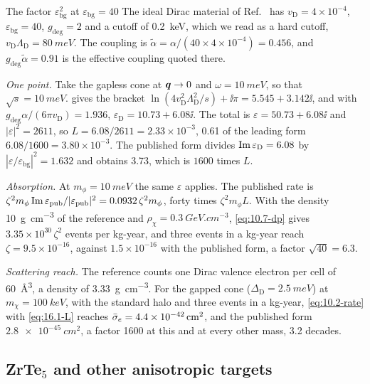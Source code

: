 \begin{workedexample}{The factor $\varepsilon_{\mathrm{bg}}^2$ at $\varepsilon_{\mathrm{bg}} = 40$}\label{we:16-factor}
The ideal Dirac material of Ref.~\cite[Fig.~4]{hochberg2018detection} has $v_{\mathrm{D}} = 4\times10^{-4}$, $\varepsilon_{\mathrm{bg}} = 40$, $g_{\mathrm{deg}} = 2$ and a cutoff of \SI{0.2}{keV}, which we read as a hard cutoff, $v_{\mathrm{D}}\Lambda_{\mathrm{D}} = \SI{80}{meV}$. The coupling is $\tilde\alpha = \alpha/(40\times4\times10^{-4}) = 0.456$, and $g_{\mathrm{deg}}\tilde\alpha = 0.91$ is the effective coupling quoted there.

\emph{One point.} Take the gapless cone at $\bm{q} \to 0$ and $\omega = \SI{10}{meV}$, so that $\sqrt{s} = \SI{10}{meV}$.  gives the bracket $\ln(4v_{\mathrm{D}}^2\Lambda_{\mathrm{D}}^2/s) + \ii\pi = 5.545 + 3.142\ii$, and with $g_{\mathrm{deg}}\alpha/(6\pi v_{\mathrm{D}}) = 1.936$, $\varepsilon_{\mathrm{D}} = 10.73 + 6.08\ii$. The total is $\varepsilon = 50.73 + 6.08\ii$ and $|\varepsilon|^2 = 2611$, so $L = 6.08/2611 = 2.33\times10^{-3}$, 0.61 of the leading form $6.08/1600 = 3.80\times10^{-3}$. The published form divides $\operatorname{Im}\varepsilon_{\mathrm{D}} = 6.08$ by $|\varepsilon/\varepsilon_{\mathrm{bg}}|^2 = 1.632$ and obtains 3.73, which is $1600$ times $L$.

\emph{Absorption.} At $m_\phi = \SI{10}{meV}$ the same $\varepsilon$ applies. The published rate is $\zeta^2m_\phi\operatorname{Im}\varepsilon_{\mathrm{pub}}/|\varepsilon_{\mathrm{pub}}|^2 = 0.0932\,\zeta^2m_\phi$, forty times $\zeta^2m_\phi L$. With the density \SI{10}{g.cm^{-3}} of the reference and $\rho_\chi = \SI{0.3}{GeV.cm^{-3}}$, \cref{eq:10.7-dp} gives $3.35\times10^{30}\,\zeta^2$ events per kg-year, and three events in a kg-year reach $\zeta = 9.5\times10^{-16}$, against $1.5\times10^{-16}$ with the published form, a factor $\sqrt{40} = 6.3$.

\emph{Scattering reach.} The reference counts one Dirac valence electron per cell of \SI{60}{\angstrom^3}, a density of \SI{3.33}{g.cm^{-3}}. For the gapped cone ($\Delta_{\mathrm{D}} = \SI{2.5}{meV}$) at $m_\chi = \SI{100}{keV}$, with the standard halo and three events in a kg-year, \cref{eq:10.2-rate} with \cref{eq:16.1-L} reaches $\bar{\sigma}_{e} = \SI{4.4e-42}{cm^2}$, and the published form $\SI{2.8e-45}{cm^2}$, a factor 1600 at this and at every other mass, 3.2 decades.
\end{workedexample}

\subsection{ZrTe\texorpdfstring{$_5$}{5} and other anisotropic targets}\label{sec:16.1-zrte5}

